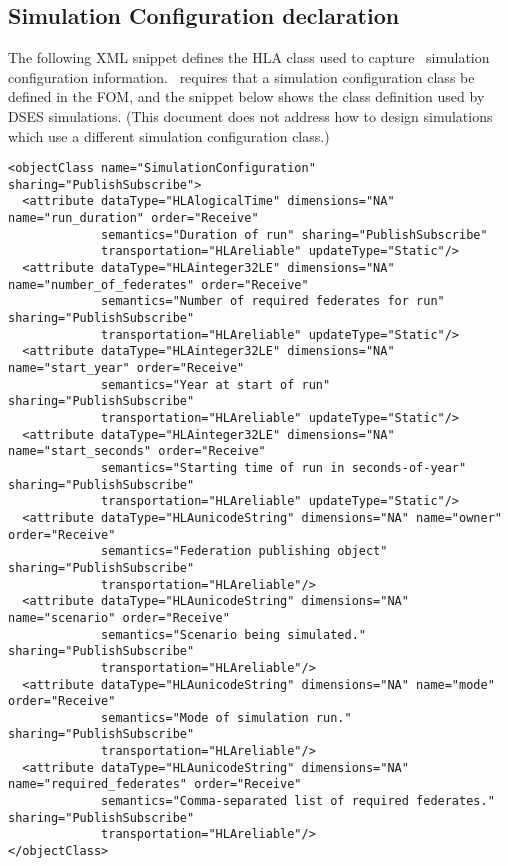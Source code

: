 \subsection{Simulation Configuration declaration}

The following XML snippet defines the HLA class used to capture
\TrickHLA\ simulation configuration information.
\TrickHLA\ requires that a simulation configuration class be defined in
the FOM, and the snippet below shows the class definition used by
DSES simulations.
(This document does not address how to design simulations which use a
different simulation configuration class.)

\begin{lstlisting}[caption={FOM snippet defining a interaction},label={list:FOM-snippet-config}]
<objectClass name="SimulationConfiguration" sharing="PublishSubscribe">
  <attribute dataType="HLAlogicalTime" dimensions="NA" name="run_duration" order="Receive"
             semantics="Duration of run" sharing="PublishSubscribe"
             transportation="HLAreliable" updateType="Static"/>
  <attribute dataType="HLAinteger32LE" dimensions="NA" name="number_of_federates" order="Receive"
             semantics="Number of required federates for run" sharing="PublishSubscribe"
             transportation="HLAreliable" updateType="Static"/>
  <attribute dataType="HLAinteger32LE" dimensions="NA" name="start_year" order="Receive"
             semantics="Year at start of run" sharing="PublishSubscribe"
             transportation="HLAreliable" updateType="Static"/>
  <attribute dataType="HLAinteger32LE" dimensions="NA" name="start_seconds" order="Receive"
             semantics="Starting time of run in seconds-of-year" sharing="PublishSubscribe"
             transportation="HLAreliable" updateType="Static"/>
  <attribute dataType="HLAunicodeString" dimensions="NA" name="owner" order="Receive"
             semantics="Federation publishing object" sharing="PublishSubscribe"
             transportation="HLAreliable"/>
  <attribute dataType="HLAunicodeString" dimensions="NA" name="scenario" order="Receive"
             semantics="Scenario being simulated." sharing="PublishSubscribe"
             transportation="HLAreliable"/>
  <attribute dataType="HLAunicodeString" dimensions="NA" name="mode" order="Receive"
             semantics="Mode of simulation run." sharing="PublishSubscribe"
             transportation="HLAreliable"/>
  <attribute dataType="HLAunicodeString" dimensions="NA" name="required_federates" order="Receive"
             semantics="Comma-separated list of required federates." sharing="PublishSubscribe"
             transportation="HLAreliable"/>
</objectClass>
\end{lstlisting}

